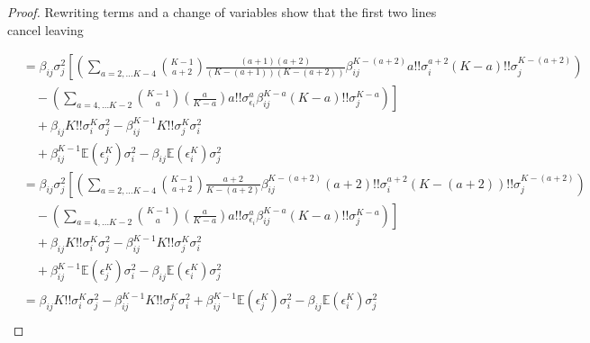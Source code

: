 \documentclass[]{article}
\newcommand{\E}{\mathbb{E}}
\begin{document}
\begin{proof}
Rewriting terms and a change of variables show that the first two lines cancel leaving

\begin{equation}
\begin{aligned}
&= \beta_{ij}\sigma_j^2\left[\left(\sum_{a = 2,\ldots K-4}{K-1 \choose a+2}\frac{(a+1)(a+2)}{(K-(a + 1))(K-(a+2))} \beta_{ij}^{K- (a + 2)}a!! \sigma_{i}^{a + 2} (K-a)!!\sigma_{j}^{K-(a+2)}\right)\right.
\\
&\quad - \left.\left(\sum_{a = 4,\ldots K-2}{K-1 \choose a}\left(\frac{a}{K-a}\right) a!!\sigma_{\epsilon_i}^a \beta_{ij}^{K - a}(K-a)!!\sigma_{j}^{K-a}\right)\right]\\
& \quad + \beta_{ij}K!!\sigma_i^K\sigma_j^2 - \beta_{ij}^{K-1}K!!\sigma_j^K \sigma_i^2\\
& \quad + \beta_{ij}^{K-1}\E(\epsilon_j^K)\sigma_i^2 - \beta_{ij}\E(\epsilon_i^K)\sigma_j^2\\
&= \beta_{ij}\sigma_j^2\left[\left(\sum_{a = 2,\ldots K-4}{K-1 \choose a+2}\frac{a+2}{K-(a+2)} \beta_{ij}^{K- (a + 2)}(a+2)!! \sigma_{i}^{a + 2} (K-(a+2))!!\sigma_{j}^{K-(a+2)}\right)\right.
\\
&\quad - \left.\left(\sum_{a = 4,\ldots K-2}{K-1 \choose a}\left(\frac{a}{K-a}\right) a!!\sigma_{\epsilon_i}^a \beta_{ij}^{K - a}(K-a)!!\sigma_{j}^{K-a}\right)\right]\\
& \quad + \beta_{ij}K!!\sigma_i^K\sigma_j^2 - \beta_{ij}^{K-1}K!!\sigma_j^K \sigma_i^2\\
& \quad + \beta_{ij}^{K-1}\E(\epsilon_j^K)\sigma_i^2 - \beta_{ij}\E(\epsilon_i^K)\sigma_j^2\\
&= \beta_{ij}K!!\sigma_i^K\sigma_j^2 - \beta_{ij}^{K-1}K!!\sigma_j^K \sigma_i^2  + \beta_{ij}^{K-1}\E(\epsilon_j^K)\sigma_i^2 - \beta_{ij}\E(\epsilon_i^K)\sigma_j^2\\
\end{aligned}
\end{equation}


\end{proof}
\end{document}

